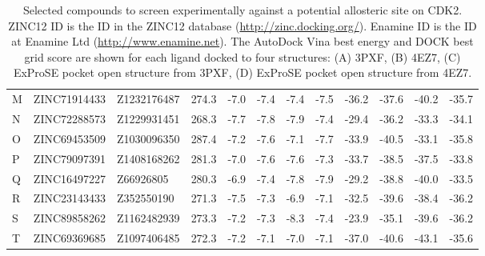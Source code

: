\begin{table}
\begin{footnotesize}
\begin{tabular}{ p{2cm} l l p{3cm} l l l l l l l l }
M     & ZINC71914433 & Z1232176487 & 274.3 & -7.0  & -7.4  & -7.4  & -7.5  & -36.2 & -37.6 & -40.2 & -35.7 \\
N     & ZINC72288573 & Z1229931451 & 268.3 & -7.7  & -7.8  & -7.9  & -7.4  & -29.4 & -36.2 & -33.3 & -34.1 \\
O     & ZINC69453509 & Z1030096350 & 287.4 & -7.2  & -7.6  & -7.1  & -7.7  & -33.9 & -40.5 & -33.1 & -35.8 \\
P     & ZINC79097391 & Z1408168262 & 281.3 & -7.0  & -7.6  & -7.6  & -7.3  & -33.7 & -38.5 & -37.5 & -33.8 \\
Q     & ZINC16497227 & Z66926805   & 280.3 & -6.9  & -7.4  & -7.8  & -7.9  & -29.2 & -38.8 & -40.0 & -33.5 \\
R     & ZINC23143433 & Z352550190  & 271.3 & -7.5  & -7.3  & -6.9  & -7.1  & -32.5 & -39.6 & -38.4 & -36.2 \\
S     & ZINC89858262 & Z1162482939 & 273.3 & -7.2  & -7.3  & -8.3  & -7.4  & -23.9 & -35.1 & -39.6 & -36.2 \\
T     & ZINC69369685 & Z1097406485 & 272.3 & -7.2  & -7.1  & -7.0  & -7.1  & -37.0 & -40.6 & -43.1 & -35.6 \\
\hline
\end{tabular}
\end{footnotesize}

\caption{Selected compounds to screen experimentally against a potential allosteric site on CDK2.
ZINC12 ID is the ID in the ZINC12 database (\url{http://zinc.docking.org/}).
Enamine ID is the ID at Enamine Ltd (\url{http://www.enamine.net}).
The AutoDock Vina best energy and DOCK best grid score are shown for each ligand docked to four structures:
(A) 3PXF,
(B) 4EZ7,
(C) ExProSE pocket open structure from 3PXF,
(D) ExProSE pocket open structure from 4EZ7.}

\label{tab:enamine_compounds}
\end{table}


